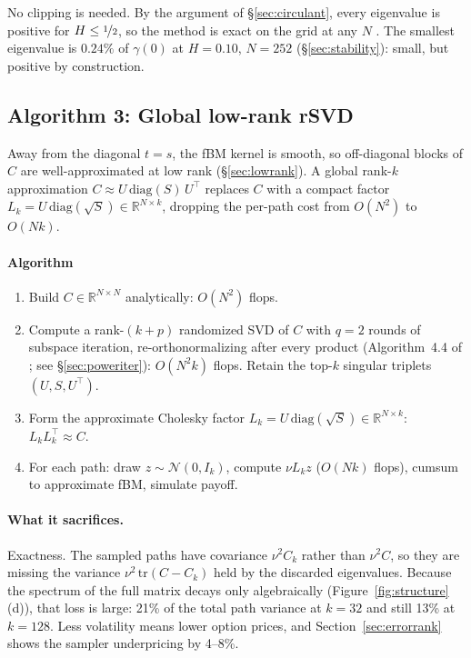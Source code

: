 No clipping is needed.  By the argument of §\ref{sec:circulant}, every eigenvalue
is positive for $H \leq \nicefrac{1}{2}$, so the method is exact on the grid at any
$N$ \citep{craigmile2003simulating}.  The smallest eigenvalue is $0.24\%$ of
$\gamma(0)$ at $H = 0.10$, $N = 252$ (§\ref{sec:stability}): small, but positive by
construction.

\subsection{Algorithm 3: Global low-rank rSVD}
\label{sec:rsvd}

Away from the diagonal $t = s$, the fBM kernel is smooth, so off-diagonal blocks of
$C$ are well-approximated at low rank (§\ref{sec:lowrank}). A global rank-$k$
approximation $C \approx U\,\mathrm{diag}(S)\,U^\top$ replaces $C$ with a compact
factor $L_k = U\,\mathrm{diag}(\sqrt{S}) \in \mathbb{R}^{N\times k}$, dropping the
per-path cost from $O(N^2)$ to $O(Nk)$.

\paragraph{Algorithm}
\begin{enumerate}
  \item Build $C \in \mathbb{R}^{N\times N}$ analytically: $O(N^2)$ flops.
  \item Compute a rank-$(k+p)$ randomized SVD of $C$ with $q = 2$ rounds of
        subspace iteration, re-orthonormalizing after every product (Algorithm~4.4
        of \citet{halko2011finding}; see §\ref{sec:poweriter}): $O(N^2 k)$ flops.
        Retain the top-$k$ singular triplets $(U, S, U^\top)$.
  \item Form the approximate Cholesky factor $L_k = U\,\mathrm{diag}(\sqrt{S})
        \in \mathbb{R}^{N\times k}$: $L_k L_k^\top \approx C$.
  \item For each path: draw $z \sim \mathcal{N}(0, I_k)$, compute $\nu L_k z$
        ($O(Nk)$ flops), cumsum to approximate fBM, simulate payoff.
\end{enumerate}

\paragraph{What it sacrifices.}
Exactness.  The sampled paths have covariance $\nu^2 C_k$ rather than $\nu^2 C$, so
they are missing the variance $\nu^2\,\mathrm{tr}(C - C_k)$ held by the discarded
eigenvalues.  Because the spectrum of the full matrix decays only algebraically
(Figure~\ref{fig:structure}(d)), that loss is large: 21\% of the total path variance
at $k = 32$ and still 13\% at $k = 128$.  Less volatility means lower option prices,
and Section~\ref{sec:errorrank} shows the sampler underpricing by 4--8\%.

